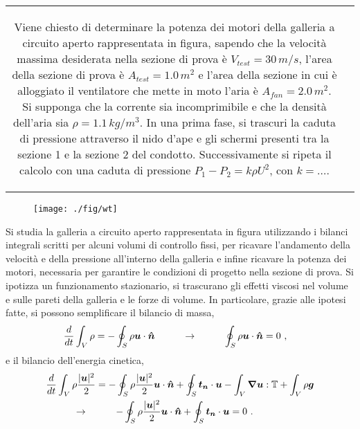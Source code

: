 \noindent
\begin{tabular}{cc}
\begin{minipage}{0.95\textwidth}
\begin{exerciseS}
 Viene chiesto di determinare la potenza dei motori della galleria a circuito aperto rappresentata in figura, sapendo che la velocità massima desiderata nella sezione di prova è $V_{test} = 30 \, m/s$, l'area della sezione di prova è $A_{test} = 1.0 \, m^2$ e l'area della sezione in cui è alloggiato il ventilatore che mette in moto l'aria è $A_{fan} = 2.0 \, m^2$. Si supponga che la corrente sia incomprimibile e che la densità dell'aria sia $\rho = 1.1 \, kg/m^3$. In una prima fase, si trascuri la caduta di pressione attraverso il nido d'ape e gli schermi presenti tra la sezione 1 e la sezione 2 del condotto. Successivamente si ripeta il calcolo con una caduta di pressione $P_1 - P_2 = k \rho U^2$, con $k = \dots$.
\end{exerciseS}
\end{minipage}
\end{tabular}
\begin{figure}[h!]
 \texttt{[image: ./fig/wt]}
\end{figure}

\sol

\partone
Si studia la galleria a circuito aperto rappresentata in figura utilizzando i bilanci integrali scritti per alcuni volumi di controllo fissi, per ricavare l'andamento della velocità e della pressione all'interno della galleria e infine ricavare la potenza dei motori, necessaria per garantire le condizioni di progetto nella sezione di prova. Si ipotizza un funzionamento stazionario, si trascurano gli effetti viscosi nel volume e sulle pareti della galleria e le forze di volume. In particolare, grazie alle ipotesi fatte, si possono semplificare il bilancio di massa,
\begin{equation}
\begin{aligned}
 & \dfrac{d}{dt} \int_V \rho = - \oint_{S} \rho \bm{u} \cdot \bm{\hat{n}} 
 \hspace{1.0cm} \rightarrow \hspace{1.0cm} \oint_{S} \rho \bm{u} \cdot \bm{\hat{n}} = 0 \ ,
\end{aligned}
\end{equation}
e il bilancio dell'energia cinetica,
\begin{equation}
\begin{aligned}
 & \dfrac{d}{dt} \int_V \rho \dfrac{|\bm{u}|^2}{2} = - \oint_{S} \rho \dfrac{|\bm{u}|^2}{2} \bm{u} \cdot \bm{\hat{n}} + \oint_S \bm{t_n} \cdot \bm{u} - \int_V \bm{\nabla} \bm{u} : \mathbb{T} + \int_V \rho \bm{g} \\
 & \hspace{1.0cm} \rightarrow \hspace{1.0cm} 
 - \oint_{S} \rho \dfrac{|\bm{u}|^2}{2} \bm{u} \cdot \bm{\hat{n}} + \oint_S \bm{t_n} \cdot \bm{u} = 0 \ . 
\end{aligned}
\end{equation}

